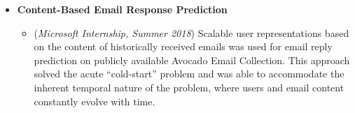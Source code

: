 \documentclass[margin,line]{resume}
\begin{document}
\begin{resume}
\begin{itemize}
\item \textbf{Content-Based Email Response Prediction}
\begin{itemize}
\item (\textit{Microsoft Internship, Summer 2018}) Scalable user representations based on the content of historically received emails was used for email reply prediction on publicly available Avocado Email Collection. This approach solved the acute ``cold-start'' problem and was able to accommodate the inherent temporal nature of the problem, where users and email content constantly evolve with time.
\end{itemize}








\end{itemize}



\end{resume}
\end{document}
